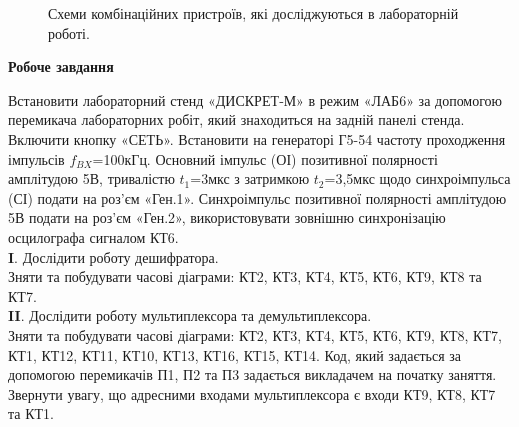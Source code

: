 \documentclass[a4paper,14pt]{extreport}
\begin{document}
\begin{figure}[h]
	\caption{Схеми комбінаційних пристроїв, які досліджуються в лабораторній роботі.}
	\label{ris1}
\end{figure}


\begin{center}
\textbf{Робоче завдання}
\end{center}
Встановити лабораторний стенд «ДИСКРЕТ‑М» в режим «ЛАБ6» за допомогою перемикача лабораторних робіт, який знаходиться на задній панелі стенда. 
Включити кнопку «СЕТЬ».
Встановити на генераторі Г5-54 частоту проходження імпульсів $f_{BX}$=100кГц. Основний імпульс (ОІ) позитивної полярності амплітудою 5В, тривалістю $t_{1}$=3мкс з затримкою $t_{2}$=3,5мкс щодо синхроімпульса (СІ) подати на роз'єм «Ген.1». Синхроімпульс позитивної полярності амплітудою 5В подати на роз'єм «Ген.2», використовувати зовнішню синхронізацію осцилографа сигналом КТ6.\\
\textbf{I}.  Дослідити роботу дешифратора.\\
Зняти та побудувати часові діаграми: КТ2, КТ3, КТ4, КТ5, КТ6, КТ9, КТ8 та КТ7.\\
\textbf{II}.  Дослідити роботу мультиплексора та демультиплексора.\\
Зняти та побудувати часові діаграми: КТ2, КТ3, КТ4, КТ5, КТ6, КТ9, КТ8, КТ7, КТ1, КТ12, КТ11, КТ10, КТ13, КТ16, КТ15, КТ14.
Код, який задається за допомогою перемикачів П1, П2 та П3 задається викладачем на початку заняття.\\  
Звернути увагу, що адресними входами мультиплексора є входи КТ9, КТ8, КТ7 та КТ1.
\end{document}
